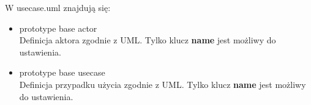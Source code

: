 W usecase.uml znajdują się:
\begin{itemize}
\item prototype base actor \\
Definicja aktora zgodnie z UML. Tylko klucz \textbf{name} jest możliwy do ustawienia.
\item prototype base usecase \\
Definicja przypadku użycia zgodnie z UML. Tylko klucz \textbf{name} jest możliwy do ustawienia.

\end{itemize}